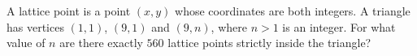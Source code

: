 A lattice point is a point $(x,y)$ whose coordinates are both integers. A triangle has vertices $(1,1)$, $(9,1)$ and $(9,n)$, where $n>1$ is an integer. For what value of $n$ are there exactly $560$ lattice points strictly inside the triangle?
